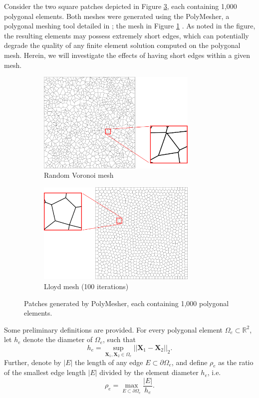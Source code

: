 Consider the two square patches depicted in Figure \ref{fig:polygonal_patches}, each containing 1,000 polygonal elements. Both meshes were generated using the PolyMesher, a polygonal meshing tool detailed in \cite{Talischi:12}; the mesh in Figure \ref{fig:patch_mesh} . As noted in the figure, the resulting elements may possess extremely short edges, which can potentially degrade the quality of any finite element solution computed on the polygonal mesh. Herein, we will investigate the effects of having short edges within a given mesh.
\begin{figure}[!h]
    \centering
    \begin{subfigure}[b]{0.49\linewidth}
            \centering
            \includegraphics[width=3.0in]{figures/patch_mesh.pdf}
    			\caption{Random Voronoi mesh \label{fig:patch_mesh}}
    \end{subfigure}
	\begin{subfigure}[b]{0.49\linewidth}
            \centering
            \includegraphics[width=3.0in]{figures/lloyd_mesh.pdf}
    			\caption{Lloyd mesh (100 iterations) \label{fig:lloyd_mesh}}
    \end{subfigure}
    \caption{Patches generated by PolyMesher, each containing 1,000 polygonal elements.}
    \label{fig:polygonal_patches}
\end{figure}

Some preliminary definitions are provided. For every polygonal element $\Omega_e \subset \mathbb{R}^2$, let $h_e$ denote the diameter of $\Omega_e$, such that
\begin{equation}
	h_e = \sup_{\mathbf{X}_1, \mathbf{X}_2 \in \Omega_e} || \mathbf{X}_1 - \mathbf{X}_2 ||_2.
\end{equation}
Further, denote by $|E|$ the length of any edge $E \subset \partial \Omega_e$, and define $\rho_e$ as the ratio of the smallest edge length $|E|$ divided by the element diameter $h_e$, i.e.
\begin{equation}
	\rho_e = \max_{E \subset \partial \Omega_e} \frac{|E|}{h_e}.
\end{equation}

